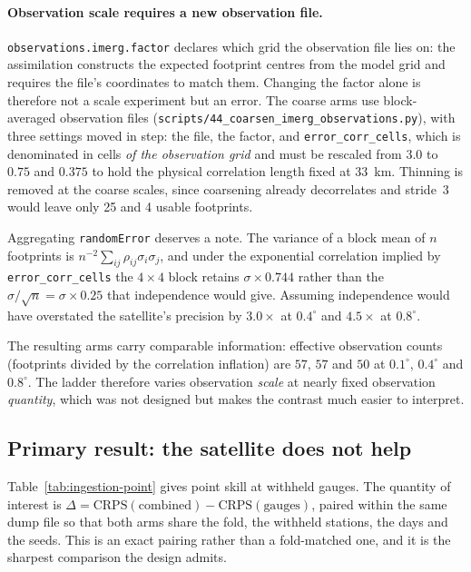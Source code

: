 \paragraph{Observation scale requires a new observation file.}
\texttt{observations.imerg.factor} declares which grid the observation file
lies on: the assimilation constructs the expected footprint centres from the
model grid and requires the file's coordinates to match them. Changing the
factor alone is therefore not a scale experiment but an error. The coarse arms
use block-averaged observation files
(\texttt{scripts/44\_coarsen\_imerg\_observations.py}), with three settings
moved in step: the file, the factor, and \texttt{error\_corr\_cells}, which is
denominated in cells \emph{of the observation grid} and must be rescaled from
$3.0$ to $0.75$ and $0.375$ to hold the physical correlation length fixed at
$33$~km. Thinning is removed at the coarse scales, since coarsening already
decorrelates and stride~3 would leave only 25 and 4 usable footprints.

Aggregating \texttt{randomError} deserves a note. The variance of a block mean
of $n$ footprints is $n^{-2}\sum_{ij}\rho_{ij}\sigma_i\sigma_j$, and under the
exponential correlation implied by \texttt{error\_corr\_cells} the $4\times4$
block retains $\sigma \times 0.744$ rather than the $\sigma/\sqrt{n} = \sigma
\times 0.25$ that independence would give. Assuming independence would have
overstated the satellite's precision by $3.0\times$ at $0.4^\circ$ and
$4.5\times$ at $0.8^\circ$.

The resulting arms carry comparable information: effective observation counts
(footprints divided by the correlation inflation) are $57$, $57$ and $50$ at
$0.1^\circ$, $0.4^\circ$ and $0.8^\circ$. The ladder therefore varies
observation \emph{scale} at nearly fixed observation \emph{quantity}, which was
not designed but makes the contrast much easier to interpret.

\subsection{Primary result: the satellite does not help}

Table~\ref{tab:ingestion-point} gives point skill at withheld gauges. The
quantity of interest is $\Delta = \mathrm{CRPS}(\text{combined}) -
\mathrm{CRPS}(\text{gauges})$, paired within the same dump file so that both
arms share the fold, the withheld stations, the days and the seeds. This is an
exact pairing rather than a fold-matched one, and it is the sharpest comparison
the design admits.

